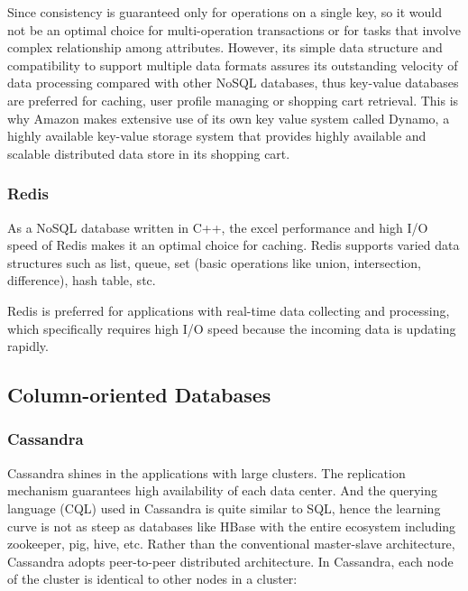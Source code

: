 Since consistency is guaranteed only for operations on a single key, so it would not be an optimal choice for multi-operation transactions or for tasks that involve complex relationship among attributes. However, its simple data structure and compatibility to support multiple data formats assures its outstanding velocity of data processing compared with other  NoSQL databases, thus key-value databases are preferred for caching, user profile managing or shopping cart retrieval. This is why Amazon makes extensive use of its own key value system called Dynamo, a highly available key-value storage
system that provides highly available and scalable
distributed data store in its shopping cart\cite{DBLP:journals/corr/MoniruzzamanH13}. 

\subsubsection{Redis}\mbox{}\mbox{}

As a NoSQL database written in C++, the excel performance and high I/O speed of Redis makes it an optimal choice for 
caching. Redis supports varied data structures such as list, queue, set (basic operations like union, intersection, difference), hash table, stc. 

Redis is preferred for applications with real-time data collecting and processing, which specifically requires high I/O speed because the incoming data is updating rapidly.

\subsection{Column-oriented Databases}

\subsubsection{Cassandra}\mbox{}\mbox{}

Cassandra shines in the applications with large clusters. The replication mechanism guarantees high availability of each data center. And the querying language (CQL) used in Cassandra is quite similar to SQL, hence the learning curve is not as steep as databases like HBase with the entire ecosystem including zookeeper, pig, hive, etc. Rather than the conventional master-slave architecture, Cassandra adopts peer-to-peer distributed
architecture. In Cassandra, each node of the cluster is identical to other nodes in a cluster:

